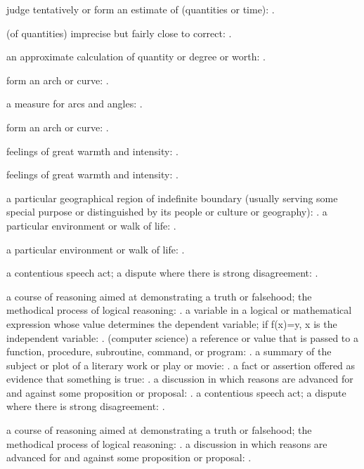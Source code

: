   judge tentatively or form an estimate of (quantities or time): .

  (of quantities) imprecise but fairly close to correct: .

  an approximate calculation of quantity or degree or worth: .

  form an arch or curve: .

  a measure for arcs and angles: .

  form an arch or curve: .

  feelings of great warmth and intensity: .

  feelings of great warmth and intensity: .

  a particular geographical region of indefinite boundary (usually serving some special purpose or distinguished by its people or culture or geography): . a particular environment or walk of life: .

  a particular environment or walk of life: .

  a contentious speech act; a dispute where there is strong disagreement: .

  a course of reasoning aimed at demonstrating a truth or falsehood; the methodical process of logical reasoning: . a variable in a logical or mathematical expression whose value determines the dependent variable; if f(x)=y, x is the independent variable: . (computer science) a reference or value that is passed to a function, procedure, subroutine, command, or program: . a summary of the subject or plot of a literary work or play or movie: . a fact or assertion offered as evidence that something is true: . a discussion in which reasons are advanced for and against some proposition or proposal: . a contentious speech act; a dispute where there is strong disagreement: .

  a course of reasoning aimed at demonstrating a truth or falsehood; the methodical process of logical reasoning: . a discussion in which reasons are advanced for and against some proposition or proposal: .

